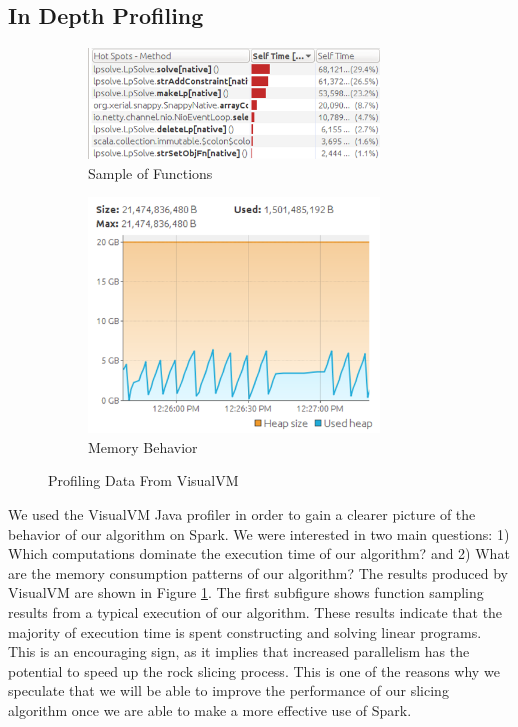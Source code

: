 \subsection{In Depth Profiling}
\begin{figure}[t]
\centering
\begin{subfigure}{0.5\textwidth}
    \centering
    \includegraphics[width=0.85\textwidth]{visualVMComputation.png}
    \caption{Sample of Functions}
\end{subfigure}%
\begin{subfigure}{0.5\textwidth}
    \centering
    \includegraphics[width=0.85\textwidth]{visualVMMemory.png}
    \caption{Memory Behavior}
\end{subfigure}
\caption{Profiling Data From VisualVM}
\label{fig:visualVM}
\end{figure}
We used the VisualVM Java profiler \cite{visualVM} in order to gain a clearer picture of the behavior of our algorithm on Spark. We were interested in two main questions: 1) Which computations dominate the execution time of our algorithm? and 2) What are the memory consumption patterns of our algorithm? The results produced by VisualVM are shown in Figure \ref{fig:visualVM}. The first subfigure shows function sampling results from a typical execution of our algorithm. These results indicate that the majority of execution time is spent constructing and solving linear programs. This is an encouraging sign, as it implies that increased parallelism has the potential to speed up the rock slicing process. This is one of the reasons why we speculate that we will be able to improve the performance of our slicing algorithm once we are able to make a more effective use of Spark.

